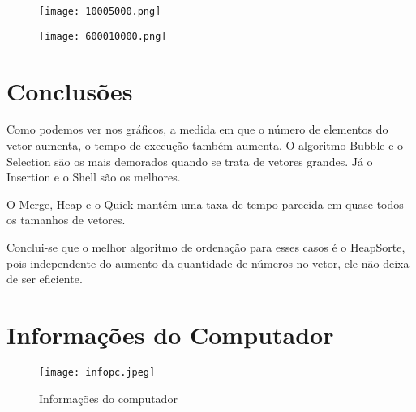 \documentclass{article}
\begin{document}
\newpage

\begin{figure}[h] %
	
	\texttt{[image: 10005000.png]} 
\end{figure}%
\begin{figure}[h] %
	
	\texttt{[image: 600010000.png]} 
\end{figure}%


\newpage
\section{Conclusões}
\vspace{0.5cm}

	 Como podemos ver nos gráficos, a medida em que o número de elementos do vetor aumenta, o tempo de execução também aumenta. O algoritmo Bubble e o Selection são os mais demorados quando se trata de vetores grandes. Já o Insertion e o Shell são os melhores.
	
	 O Merge, Heap e o Quick mantém uma taxa de tempo parecida em quase todos os tamanhos de vetores.
	
	 Conclui-se que o melhor algoritmo de ordenação para esses casos é o HeapSorte, pois independente do aumento da quantidade de números no vetor, ele não deixa de ser eficiente.
	
	
	
	
	\newpage
	\section{Informações do Computador}	
	
	
	\begin{figure}[h] %
		\centering
		\texttt{[image: infopc.jpeg]} 
		\caption{Informações do computador} %
	\end{figure}%
\end{document}
